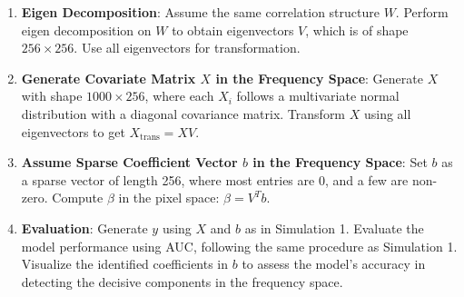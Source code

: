 \documentclass[12pt]{article}
\begin{document}
\begin{enumerate}
	\item \textbf{Eigen Decomposition}: Assume the same correlation structure \( W \). Perform eigen decomposition on \( W \) to obtain eigenvectors \( V \), which is of shape \( 256 \times 256 \). Use all eigenvectors for transformation.

	\item \textbf{Generate Covariate Matrix \( X \) in the Frequency Space}: Generate \( X \) with shape \( 1000 \times 256 \), where each \( X_i \) follows a multivariate normal distribution with a diagonal covariance matrix. Transform \( X \) using all eigenvectors to get \( X_{\text{trans}} = X V \).

	\item \textbf{Assume Sparse Coefficient Vector \( b \) in the Frequency Space}: Set \( b \) as a sparse vector of length 256, where most entries are 0, and a few are non-zero. Compute \( \beta \) in the pixel space: \( \beta = V^T b \).

	\item \textbf{Evaluation}: Generate \( y \) using \( X \) and \( b \) as in Simulation 1. Evaluate the model performance using AUC, following the same procedure as Simulation 1. Visualize the identified coefficients in \( b \) to assess the model's accuracy in detecting the decisive components in the frequency space.
\end{enumerate}
\end{document}
